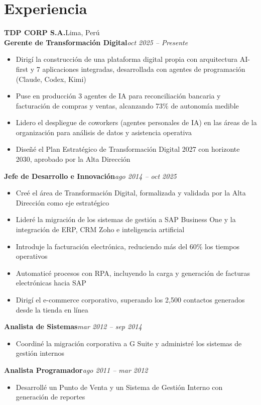 \documentclass[10pt,letterpaper]{article}
\newcommand{\role}[2]{\textbf{#1}\hfill\textit{#2}\\[-2pt]}
\newcommand{\employer}[2]{\textbf{#1}\hfill #2\\[-1pt]}
\begin{document}
\section{Experiencia}
\employer{TDP CORP S.A.}{Lima, Perú}
\role{Gerente de Transformación Digital}{oct 2025 -- Presente}
\begin{itemize}[leftmargin=1.4em, nosep]
  \item Dirigí la construcción de una plataforma digital propia con arquitectura AI-first y 7 aplicaciones integradas, desarrollada con agentes de programación (Claude, Codex, Kimi)
  \item Puse en producción 3 agentes de IA para reconciliación bancaria y facturación de compras y ventas, alcanzando 73\% de autonomía medible
  \item Lidero el despliegue de coworkers (agentes personales de IA) en las áreas de la organización para análisis de datos y asistencia operativa
  \item Diseñé el Plan Estratégico de Transformación Digital 2027 con horizonte 2030, aprobado por la Alta Dirección
\end{itemize}
\vspace{2pt}
\role{Jefe de Desarrollo e Innovación}{ago 2014 -- oct 2025}
\begin{itemize}[leftmargin=1.4em, nosep]
  \item Creé el área de Transformación Digital, formalizada y validada por la Alta Dirección como eje estratégico
  \item Lideré la migración de los sistemas de gestión a SAP Business One y la integración de ERP, CRM Zoho e inteligencia artificial
  \item Introduje la facturación electrónica, reduciendo más del 60\% los tiempos operativos
  \item Automaticé procesos con RPA, incluyendo la carga y generación de facturas electrónicas hacia SAP
  \item Dirigí el e-commerce corporativo, superando los 2,500 contactos generados desde la tienda en línea
\end{itemize}
\vspace{2pt}
\role{Analista de Sistemas}{mar 2012 -- sep 2014}
\begin{itemize}[leftmargin=1.4em, nosep]
  \item Coordiné la migración corporativa a G Suite y administré los sistemas de gestión internos
\end{itemize}
\vspace{2pt}
\role{Analista Programador}{ago 2011 -- mar 2012}
\begin{itemize}[leftmargin=1.4em, nosep]
  \item Desarrollé un Punto de Venta y un Sistema de Gestión Interno con generación de reportes
\end{itemize}
\end{document}
